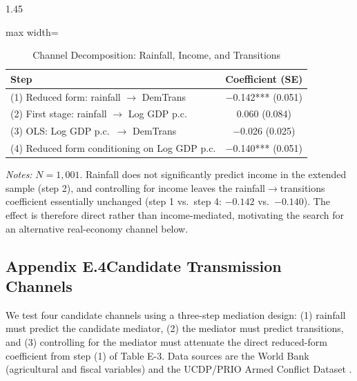 \documentclass[12pt]{article}
\begin{document}
\begin{bibunit}[jpe]
\begin{spacing}{1.45}
\begin{table}[H]
\centering
\begin{adjustbox}{max width=\textwidth}
\begin{threeparttable}
\caption{Channel Decomposition: Rainfall, Income, and Transitions}
\label{tab:E3}
\begin{tabular}{lc}
\toprule
Step & Coefficient (SE) \\
\midrule
(1) Reduced form: rainfall $\to$ DemTrans                     & $-$0.142*** (0.051) \\
(2) First stage: rainfall $\to$ Log GDP p.c.\                 & 0.060 (0.084) \\
(3) OLS: Log GDP p.c.\ $\to$ DemTrans                         & $-$0.026 (0.025) \\
(4) Reduced form conditioning on Log GDP p.c.                 & $-$0.140*** (0.051) \\
\bottomrule
\end{tabular}
\begin{tablenotes}[flushleft]
\footnotesize
\item \textit{Notes:} $N=1{,}001$. Rainfall does not significantly predict income in the extended sample (step 2), and controlling for income leaves the rainfall$\to$transitions coefficient essentially unchanged (step 1 vs.\ step 4: $-0.142$ vs.\ $-0.140$). The effect is therefore direct rather than income-mediated, motivating the search for an alternative real-economy channel below.
\end{tablenotes}
\end{threeparttable}
\end{adjustbox}
\end{table}

\subsection*{Appendix E.4\quad Candidate Transmission Channels}

We test four candidate channels using a three-step mediation design: (1) rainfall must predict the candidate mediator, (2) the mediator must predict transitions, and (3) controlling for the mediator must attenuate the direct reduced-form coefficient from step (1) of Table E-3. Data sources are the World Bank (agricultural and fiscal variables) and the UCDP/PRIO Armed Conflict Dataset \citep{gleditsch2002ucdp}.


\end{spacing}
\end{bibunit}
\end{document}
